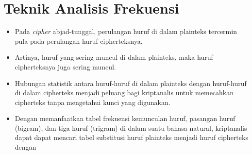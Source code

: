 \documentclass{article}
\begin{document}

\section*{Teknik Analisis Frekuensi}

\begin{itemize}
    \item Pada \textit{cipher} abjad-tunggal, perulangan huruf di dalam plainteks tercermin pula pada perulangan huruf cipherteksnya.
    \item Artinya, huruf yang sering muncul di dalam plainteks, maka huruf cipherteksnya juga sering muncul.
    \item Hubungan statistik antara huruf-huruf di dalam plainteks dengan huruf-huruf di dalam cipherteks menjadi peluang bagi kriptanalis untuk memecahkan cipherteks tanpa mengetahui kunci yang digunakan.
    \item Dengan memanfaatkan tabel frekuensi kemunculan huruf, pasangan huruf (bigram), dan tiga huruf (trigram) di dalam suatu bahasa natural, kriptanalis dapat dapat mencari tabel substitusi huruf plainteks menjadi huruf cipherteks dengan
\end{itemize}
\end{document}
